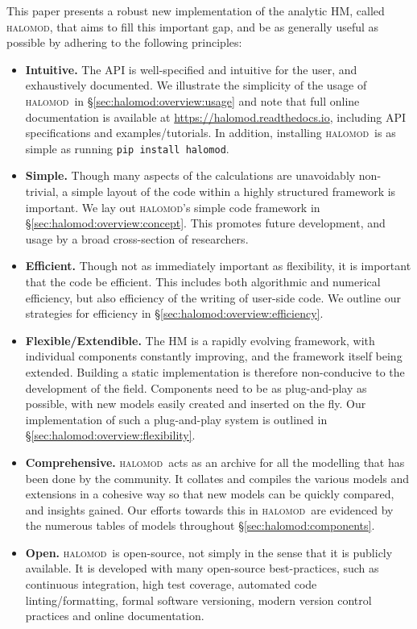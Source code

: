 \documentclass[5p,aas_macros]{elsarticle}
\newcommand{\halomod}{\textsc{halomod}}
\begin{document}
This paper presents a robust new implementation of the analytic HM, called \halomod,  that aims to fill this important gap, and be as generally useful as possible by adhering to the following principles:
\begin{itemize}
    \item \textbf{Intuitive.}  The API is well-specified and intuitive for the user, and exhaustively documented. We illustrate the simplicity of the usage of \halomod\ in \S\ref{sec:halomod:overview:usage} and note that full online documentation is available at \url{https://halomod.readthedocs.io}, including API specifications and examples/tutorials. In addition, installing \halomod\ is as simple as running \verb|pip install halomod|.
    
    \item \textbf{Simple.} Though many aspects of the calculations are unavoidably non-trivial, a simple layout of the code within a highly structured framework is important. We lay out \halomod's simple code framework in \S\ref{sec:halomod:overview:concept}. This promotes future development, and usage by a broad cross-section of researchers. 
    
    \item \textbf{Efficient. } Though not as immediately important as flexibility, it is important that the code be efficient. This includes both algorithmic and numerical efficiency, but also efficiency of the writing of user-side code.
    We outline our strategies for efficiency in \S\ref{sec:halomod:overview:efficiency}.
    
    \item \textbf{Flexible/Extendible. } The HM is a rapidly evolving framework, with individual components const\-antly improving, and the framework itself being extended. Building a static implementation is therefore non-conducive  to the development of the field. Components need to be as plug-and-play as possible, with new models easily created and inserted on the fly. Our implementation of 
    such a plug-and-play system is outlined in \S\ref{sec:halomod:overview:flexibility}.
    
    \item \textbf{Comprehensive. } \halomod\ acts as an archive for all the modelling that has been done by the community. It collates and compiles the various models and extensions in a cohesive way so that new models can be quickly compared, and insights gained. Our efforts towards this in \halomod\ are evidenced by the numerous tables of models throughout \S\ref{sec:halomod:components}.
    
    \item \textbf{Open. } \halomod\ is open-source, not simply in the sense that it is publicly available. It is developed with many open-source best-practices, such as continuous integration, high test coverage, automated code linting/formatting, formal software versioning, modern version control practices and online documentation. 
\end{itemize}
\end{document}
